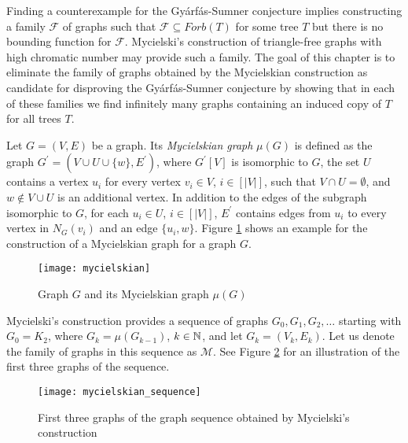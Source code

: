 Finding a counterexample for the Gyárfás-Sumner conjecture implies constructing a family $\mathcal{F}$ of graphs such that $\mathcal{F}\subseteq\textit{Forb}(T)$ for some tree $T$ but there is no bounding function for $\mathcal{F}$. Mycielski's construction of triangle-free graphs with high chromatic number \cite{My55} may provide such a family. The goal of this chapter is to eliminate the family of graphs obtained by the Mycielskian construction as candidate for disproving the Gyárfás-Sumner conjecture by showing that in each of these families we find infinitely many graphs containing an induced copy of $T$ for all trees $T$.

\begin{defn}
Let $G=(V,E)$ be a graph. Its \textit{Mycielskian graph} $\mu(G)$ is defined as the graph $G^\prime=(V\cup U\cup\{w\}, E^\prime)$, where $G^\prime [V]$ is isomorphic to $G$, the set $U$ contains a vertex $u_i$ for every vertex $v_i\in V$, $i\in [\vert V\vert]$, such that $V\cap U=\emptyset$, and $w\notin V\cup U$ is an additional vertex. In addition to the edges of the subgraph isomorphic to $G$, for each $u_i\in U$, $i\in [\vert V\vert]$, $E^\prime$ contains edges from $u_i$ to every vertex in $N_G(v_i)$ and an edge $\lbrace u_i ,w\rbrace$. Figure \ref{f1my} shows an example for the construction of a Mycielskian graph for a graph $G$.
\end{defn}

\begin{figure}[ht]
\begin{center}
\texttt{[image: mycielskian]}
\end{center}
\caption{Graph $G$ and its Mycielskian graph $\mu (G)$}
\label{f1my}
\end{figure}

Mycielski's construction provides a sequence of graphs $G_0, G_1, G_2,\dots $ starting with $G_0=K_2$, where $G_k = \mu (G_{k-1})$, $k\in\mathbb{N}$, and let $G_k=(V_k,E_k)$. Let us denote the family of graphs in this sequence as $\mathcal{M}$. See Figure \ref{f2my} for an illustration of the first three graphs of the sequence. 

\begin{figure}[ht]
\begin{center}
\texttt{[image: mycielskian\_sequence]}
\end{center}
\caption{First three graphs of the graph sequence obtained by Mycielski's construction}
\label{f2my}
\end{figure}

